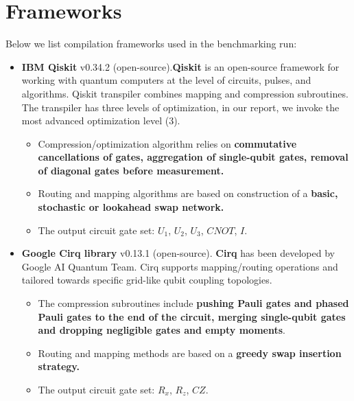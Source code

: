 \documentclass{report}%
\begin{document}
\section{Frameworks }%
\label{sec:Frameworks}%
Below we list compilation frameworks used in the benchmarking run:%
\begin{itemize}%
\item%
\textbf{IBM Qiskit}\footnotemark%
%
v0.34.2 (open-source).\textbf{Qiskit} is an open-source framework for working with quantum computers at the
                            level of circuits, pulses, and algorithms. Qiskit transpiler combines mapping and
                            compression subroutines. The transpiler has three levels of optimization, in our report,
                            we invoke the most advanced optimization level (3).%
\begin{itemize}%
\item%
Compression/optimization algorithm relies on \textbf{commutative cancellations of
                                gates, aggregation of single-qubit gates, removal of diagonal gates before
                                measurement.}%
\item%
Routing and mapping algorithms are based on construction of a
                                \textbf{basic, stochastic or lookahead swap network.}%
\item%
The output circuit gate set: %
$U_1$, $U_2$, $U_3$, $CNOT$, $I$.%
\end{itemize}%
\end{itemize}%
\begin{itemize}%
\item%
\textbf{Google Cirq library} %
v0.13.1 (open-source). \textbf{Cirq} has been developed by Google AI Quantum Team. Cirq supports
                            mapping/routing operations and tailored towards specific grid-like qubit coupling
                            topologies.%
\begin{itemize}%
\item%
The compression subroutines include \textbf{pushing Pauli gates and phased
                                Pauli gates to the end of the circuit, merging single-qubit gates and dropping
                                negligible gates and empty moments}.%
\item%
Routing and mapping methods are based on a \textbf{greedy swap insertion
                                strategy.}%
\item%
The output circuit gate set: $R_x$, $R_z$, $CZ$.%
\end{itemize}%
\end{itemize}
\end{document}
